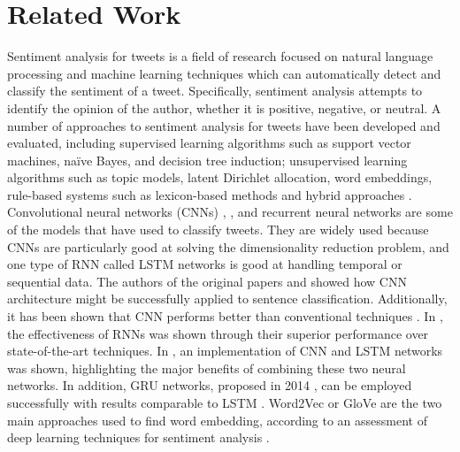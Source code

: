 \section{Related Work}
Sentiment analysis for tweets is a field of research focused on natural language processing and machine learning techniques which can automatically detect and classify the sentiment of a tweet. Specifically, sentiment analysis attempts to identify the opinion of the author, whether it is positive, negative, or neutral.  A number of approaches to sentiment analysis for tweets have been developed and evaluated, including supervised learning algorithms such as support vector machines, naïve Bayes, and decision tree induction; unsupervised learning algorithms such as topic models, latent Dirichlet allocation, word embeddings, rule-based systems such as lexicon-based methods and hybrid approaches \cite{chakrabarti2023hashtag}. Convolutional neural networks (CNNs) \cite{xu1993least}, \cite{lecun1999object}, and recurrent neural networks \cite{rumelhart1985learning} are some of the models that have used to classify tweets. They are widely used because CNNs are particularly good at solving the dimensionality reduction problem, and one type of RNN called LSTM networks \cite{choo2020deep} is good at handling temporal or sequential data. The authors of the original papers \cite{kim2014convolutional} and \cite{dos2014deep} showed how CNN architecture might be successfully applied to sentence classification. Additionally, it has been shown that CNN performs better than conventional techniques \cite{ray2020mixed}. In \cite{lairecurrent}, the effectiveness of RNNs was shown through their superior performance over state-of-the-art techniques. In \cite{tang2015document}, an implementation of CNN and LSTM networks was shown, highlighting the major benefits of combining these two neural networks. In addition, GRU networks, proposed in 2014 \cite{cho2014learning}, can be employed successfully with results comparable to LSTM \cite{chung2014empirical}. Word2Vec \cite{mikolov2013efficient} or GloVe \cite{pennington2014glove} are the two main approaches used to find word embedding, according to an assessment of deep learning techniques for sentiment analysis \cite{zhang2018deep}.

